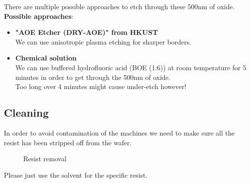 There are multiple possible approaches to etch through these 500nm of oxide.\\

\textbf{Possible approaches}:
\begin{itemize}
	\item \textbf{"AOE Etcher (DRY-AOE)" from HKUST} \\
	We can use anisotropic plasma etching for sharper borders.
	\item \textbf{Chemical solution} \\
	We can use buffered hydrofluoric acid (BOE (1:6)) at room temperature for 5 minutes in order to get through the 500nm of oxide.\\
	Too long over 4 minutes might cause under-etch however!
\end{itemize}

\subsection{Cleaning}
In order to avoid contamination of the machines we need to make sure all the resist has been stripped off from the wafer.
\begin{figure}[H]
	\centering
	\begin{tikzpicture}[node distance = 3cm, auto, thick,scale=\CrossSectionOnly, every node/.style={transform shape}]
		
	\end{tikzpicture}
	\drawStepArrow{}
	\begin{tikzpicture}[node distance = 3cm, auto, thick,scale=\CrossSectionOnly, every node/.style={transform shape}]
		
	\end{tikzpicture}
	\caption{Resist removal}
\end{figure}
Please just use the solvent for the specific resist.

\newpage

